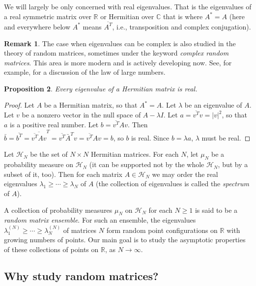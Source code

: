 \documentclass[letterpaper,11pt,oneside,reqno]{amsart}
\numberwithin{equation}{section}
\newtheorem{proposition}{Proposition}[section]
\theoremstyle{definition}
\newtheorem{remark}[proposition]{Remark}
\begin{document}
We will largely be only concerned with real eigenvalues.  That is the
eigenvalues of a real symmetric matrix over $\mathbb R$ or Hermitian over
$\mathbb C$ that is where $A^*=A$
(here and everywhere below
$A^*$ means $\overline{A^{T}}$, i.e., transposition and complex conjugation).

\begin{remark}\label{rmk:complex_eigenvalues}
	The case when eigenvalues can be complex is also studied in
	the theory of random matrices, sometimes under the keyword \emph{complex
	random matrices}. 
	This area is more modern and is actively developing now.
	See, for example, \cite{gotze2010circular} for a discussion of the law of 
	large numbers.
\end{remark}

\begin{proposition}
Every eigenvalue of a Hermitian matrix is real.
\end{proposition}
\begin{proof}
Let $A$ be a Hermitian matrix, so that $A^*=A$.
Let $\lambda$ be an eigenvalue of $A$.  Let $v$ be a nonzero vector in the null
space of $A-\lambda I$.  Let $a=\overline{ v^{T}}v=|v|^2$, so
that $a$ is a positive real number.  Let $b=\overline{ v^{T}}A
v$.  Then $\bar b=\overline{ b^{T}}=\overline{\overline{
v^{T}}Av}^{T}=\overline{
v^{T}}\bar A^{T} v=\overline{
v^{T}}Av=b$, so $b$ is real.  Since $b=\lambda a$, $\lambda$
must be real. 
\end{proof}

Let $\mathcal H_N$ be the set of $N\times N$ Hermitian matrices.  For each
$N$, let $\mu_N$ be a probability measure on $\mathcal H_N$ (it can be
supported not by  the whole $\mathcal H_N$, but by a subset of it, too).  Then
for each matrix $A\in \mathcal H_N$ we may order the real eigenvalues
$\lambda_1\geq \cdots \geq \lambda_N$ of $A$ (the collection of eigenvalues
is called the \emph{spectrum} of $A$).

A collection of probability measures $\mu_N$ on $\mathcal H_N$ for each
$N\ge1$ is said to be a \emph{random matrix ensemble}. For such an ensemble,
the eigenvalues $\lambda_1^{(N)}\geq \cdots \geq \lambda_N^{(N)}$ of matrices
$N$ form random point configurations on $\mathbb{R}$ with growing numbers of points.
Our main goal is to study the asymptotic properties of these collections of points on $\mathbb{R}$,
as $N\to\infty$.


\subsection{Why study random matrices?} %
\label{sub:why_study_random_matrices_}
\end{document}
